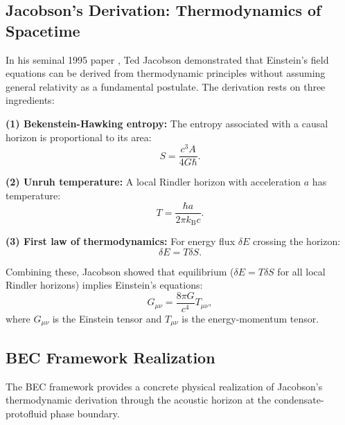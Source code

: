 \documentclass[11pt,a4paper]{article}
\newcommand{\kB}{\ensuremath{k_{\mathrm{B}}}}
\theoremstyle{definition}
\theoremstyle{remark}
\begin{document}
\subsection{Jacobson's Derivation: Thermodynamics of Spacetime}
\label{sec:jacobson_derivation}

In his seminal 1995 paper \cite{Jacobson1995}, Ted Jacobson demonstrated that Einstein's field equations can be derived from thermodynamic principles without assuming general relativity as a fundamental postulate. The derivation rests on three ingredients:

\textbf{(1) Bekenstein-Hawking entropy:} The entropy associated with a causal horizon is proportional to its area:
\begin{equation}
\label{eq:bh_entropy}
S = \frac{c^3 A}{4 G \hbar}.
\end{equation}

\textbf{(2) Unruh temperature:} A local Rindler horizon with acceleration $a$ has temperature:
\begin{equation}
\label{eq:unruh_temp}
T = \frac{\hbar a}{2\pi \kB c}.
\end{equation}

\textbf{(3) First law of thermodynamics:} For energy flux $\delta E$ crossing the horizon:
\begin{equation}
\label{eq:first_law}
\delta E = T \delta S.
\end{equation}

Combining these, Jacobson showed that equilibrium ($\delta E = T \delta S$ for all local Rindler horizons) implies Einstein's equations:
\begin{equation}
\label{eq:einstein_eqs}
G_{\mu\nu} = \frac{8\pi G}{c^4} T_{\mu\nu},
\end{equation}
where $G_{\mu\nu}$ is the Einstein tensor and $T_{\mu\nu}$ is the energy-momentum tensor.

\subsection{BEC Framework Realization}
\label{sec:bec_jacobson}

The BEC framework provides a concrete physical realization of Jacobson's thermodynamic derivation through the acoustic horizon at the condensate-protofluid phase boundary.
\end{document}
